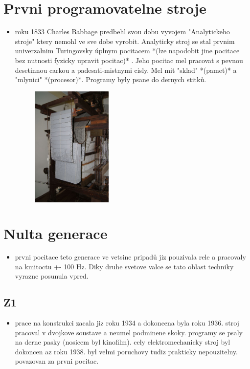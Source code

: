 \documentclass[a4paper,12pt]{article}
\begin{document}
\section{Prvni programovatelne stroje}
    \begin{itemize}
        \item{roku 1833 Charles Babbage predbehl svou dobu vyvojem "Analytickeho stroje" ktery nemohl ve sve dobe vyrobit. Analyticky stroj se stal prvnim univerzalnim Turingovsky úplnym pocitacem *(lze napodobit jine pocitace bez nutnosti fyzicky upravit pocitac)* . Jeho pocitac mel pracovat s pevnou desetinnou carkou a padesati-mistnymi cisly. Mel mit "sklad" *(pamet)* a "mlynici" *(procesor)*. Programy byly psane do dernych stitků.}
        \begin{figure}[htp]
            \centering
            \includegraphics[width=4cm]{TVP_11_9_23@4.jpg}
        \end{figure}
    \end{itemize}
    
\section{Nulta generace}
    \begin{itemize}
        \item{prvni pocitace teto generace ve vetsine pripadů jiz pouzivala rele a pracovaly na kmitoctu +- 100 Hz. Diky druhe svetove valce se tato oblast techniky vyrazne posunula vpred.}
    \end{itemize}
    \subsection{Z1}
        \begin{itemize}
            \item{prace na konstrukci zacala jiz roku 1934 a dokoncena byla roku 1936. stroj pracoval v dvojkove soustave a neumel podminene skoky. programy se psaly na derne pasky (nosicem byl kinofilm). cely elektromechanicky stroj byl dokoncen az roku 1938. byl velmi poruchovy tudiz prakticky nepouzitelny. povazovan za prvni pocitac.}
        \end{itemize}
\end{document}
